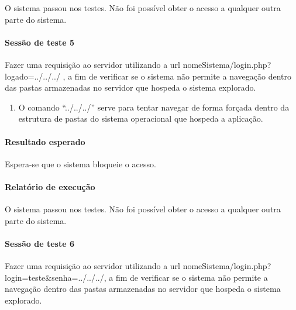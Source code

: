 \documentclass[
    12pt,               %
    openright,          %
    oneside,            %
    a4paper,            %
    section=TITLE,     %
    english,            %
    french,             %
    spanish,            %
    brazil              %
    ]{abntex2}
\begin{document}
O sistema passou nos testes. Não foi possível obter o acesso a qualquer outra parte do sistema.





\paragraph*{Sessão de teste 5}

Fazer uma requisição ao servidor utilizando a url nomeSistema/login.php?logado=../../../ , a fim de verificar se o sistema não permite a navegação dentro das pastas armazenadas no servidor que hospeda o sistema explorado.



\begin{enumerate}[start=1]
	
\item 
	O comando \textquotedblleft{}../../../\textquotedblright{} serve para tentar navegar de forma forçada dentro da estrutura de pastas do sistema operacional que hospeda a aplicação.

	

\end{enumerate}


\paragraph*{Resultado esperado}

Espera-se que o sistema bloqueie o acesso.



\paragraph*{Relatório de execução}

O sistema passou nos testes. Não foi possível obter o acesso a qualquer outra parte do sistema.





\paragraph*{Sessão de teste 6}

Fazer uma requisição ao servidor utilizando a url nomeSistema/login.php?login=teste\&senha=../../../, a fim de verificar se o sistema não permite a navegação dentro das pastas armazenadas no servidor que hospeda o sistema explorado.
\end{document}
